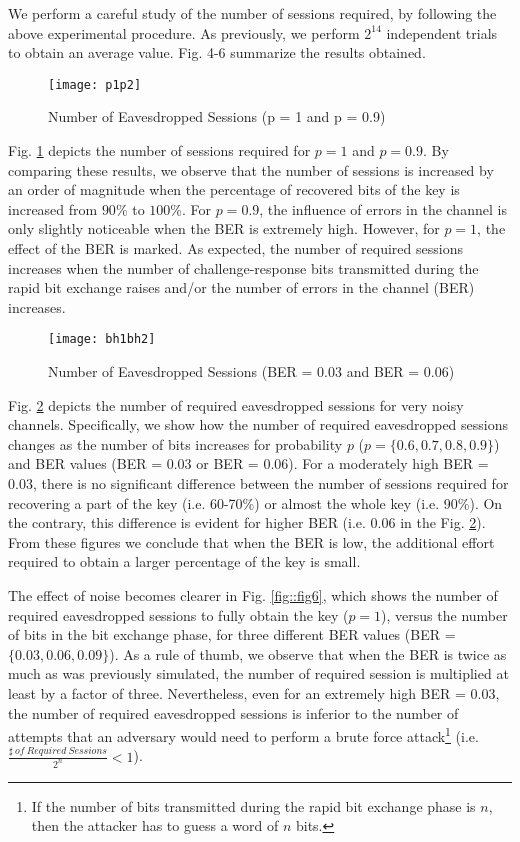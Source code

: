 \documentclass{article}
\begin{document}
We perform a careful study of the number of sessions required, by following the above experimental procedure.
As previously,  we perform  $2^{14}$ independent trials to obtain an average value. Fig. 4-6 summarize the results obtained.

\begin{figure}
\centering
\texttt{[image: p1p2]}\\
  \caption{Number of Eavesdropped Sessions (p = 1 and p = 0.9)}\label{fig::fig4}
\end{figure}

Fig. \ref{fig::fig4} depicts the number of sessions required for $p=1$ and $p=0.9$. By comparing these results, we observe that the number of sessions is increased by an order of magnitude when the percentage of recovered bits of the key is increased from $90\%$ to $100\%$.  For $p=0.9$, the influence of errors in the channel is only slightly noticeable when the BER is extremely high. However, for $p=1$, the effect of the BER is marked. As expected, the number of required sessions increases when the number of challenge-response bits transmitted during the rapid bit exchange raises and/or the number of errors in the channel (BER) increases.

\begin{figure}
\centering
\texttt{[image: bh1bh2]}\\
  \caption{Number of Eavesdropped Sessions (BER = 0.03 and BER = 0.06)}\label{fig::fig5}
\end{figure}

Fig. \ref{fig::fig5} depicts the number of required eavesdropped sessions for very noisy channels. Specifically, we show how the number of required eavesdropped sessions changes as the number of bits increases for probability $p$ ($p=\{0.6, 0.7, 0.8, 0.9\}$) and BER values (BER = 0.03 or BER = 0.06).  For a moderately high BER = 0.03, there is no significant difference between the number of sessions required for recovering a part of the key (i.e. 60-70$\%$) or almost the whole key (i.e. 90$\%$). On the contrary, this difference is evident for higher  BER (i.e. 0.06 in the Fig. \ref{fig::fig5}). From these figures we conclude that when the BER is low, the additional effort required to obtain a larger percentage of the key is small.

The effect of noise becomes clearer in Fig. \ref{fig::fig6}, which shows the number of required eavesdropped sessions to fully obtain the key ($p = 1$), versus the number of bits in the bit exchange phase, for three different BER values (BER = $\{0.03, 0.06, 0.09\}$).  As a rule of thumb, we observe that when the BER is twice as much as was previously simulated, the number of required session is multiplied at least by a factor of three.  Nevertheless, even for an extremely high BER = 0.03, the number of required eavesdropped sessions is inferior to the number of attempts that an adversary would need to perform a brute force attack\footnote{If the number of bits transmitted during the rapid bit exchange phase is $n$, then the attacker has to guess a word of $n$ bits.} (i.e. $\frac{\sharp~of~Required~Sessions}{2^n} < 1$).\\
\end{document}
